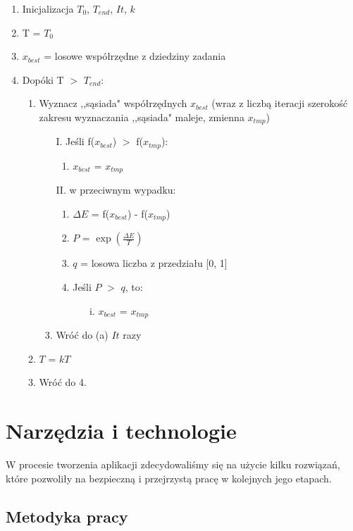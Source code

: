 \documentclass[twoside]{projektInzynierskiMS1}
\newcommand{\si}{ś}
\begin{document}
\begin{enumerate}
	\item Inicjalizacja $T_{0}$, $T_{end}$, $It$, $k$
	\item T = $T_{0}$
	\item $x_{best}$ = losowe współrzędne z dziedziny zadania
	\item Dopóki T $>$ $T_{end}$:
	
	\begin{enumerate}
		\item  Wyznacz ,,sąsiada" współrzędnych $x_{best}$ (wraz z liczbą iteracji szeroko\si ć zakresu wyznaczania ,,sąsiada" maleje, zmienna $x_{tmp}$)
		\begin{enumerate}
			\item[I.] Je\si li f($x_{best}$) $>$ f($x_{tmp}$):
			\begin{enumerate}
				\item $x_{best}$ = $x_{tmp}$
			\end{enumerate}
			\item[II.] w przeciwnym wypadku:
			\begin{enumerate}
				\item $\Delta E$ = f($x_{best}$) - f($x_{tmp}$)
				\item $P$ = $\exp\left(\frac{\Delta E}{T}\right)$
				\item $q$ = losowa liczba z przedziału [0, 1]
				\item Je\si li $P$ $>$ $q$, to:
				\begin{itemize}
					\item[i.] $x_{best}$ = $x_{tmp}$
				\end{itemize}
			\end{enumerate}
			\item Wróć do (a) $It$ razy
		\end{enumerate}
		\item $T$ = $k$$T$
		\item Wróć do 4.
	\end{enumerate}	
\end{enumerate}
	

\section{Narzędzia i technologie}
W procesie tworzenia aplikacji zdecydowali\si my się na użycie kilku rozwiązań, które pozwoliły na bezpieczną i przejrzystą pracę w kolejnych jego etapach. \\
	\subsection{Metodyka pracy}
\end{document}
